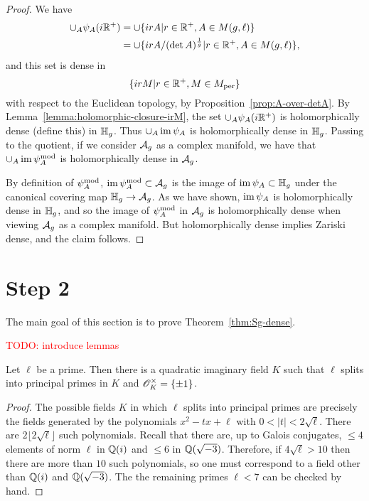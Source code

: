 \documentclass{amsart}
\begin{document}
\begin{proof}
  We have
  \begin{align*}
    \cup_A \psi_A(i\mathbb{R}^+) &= \cup \{irA | r \in \mathbb{R}^+, A \in M(g,\ell)\} \\
               &= \cup \{irA/(\det A)^{\frac{1}{g}} | r \in \mathbb{R}^+, A \in M(g,\ell)\},
  \end{align*}
  and this set is dense in
  \[
    \{irM | r \in \mathbb{R}^+, M \in M_{\textrm{per}}\}
  \]
with respect to the Euclidean topology,  by Proposition~\ref{prop:A-over-detA}.
  By Lemma~\ref{lemma:holomorphic-closure-irM}, the set $\cup_A \psi_A(i\mathbb{R}^+)$ is holomorphically dense (define this) in $\mathbb{H}_g$. Thus $\cup_A \operatorname{im} \psi_A$ is holomorphically dense in $\mathbb{H}_g$. Passing to the quotient, if we consider $\mathcal{A}_g$ as a complex manifold, we have that $\cup_A \operatorname{im} \psi_{A}^\mathrm{mod}$ is holomorphically dense in $\mathcal{A}_g$.

  By definition of $\psi_{A}^\mathrm{mod}$,  $\operatorname{im} \psi_{A}^\mathrm{mod} \subset \mathcal{A}_g$ is the image of $\operatorname{im} \psi_A \subset \mathbb{H}_g$ under the canonical covering map $\mathbb{H}_g \to \mathcal{A}_g$. As we have shown, $\operatorname{im} \psi_A$ is holomorphically dense in $\mathbb{H}_g$, and so the image of $\psi_{A}^\mathrm{mod}$ in $\mathcal{A}_g$ is holomorphically dense when viewing $\mathcal{A}_g$ as a complex manifold. But holomorphically dense implies Zariski dense, and the claim follows.
\end{proof}



\section{Step 2}
\label{sec:step-2}

The main goal of this section is to prove Theorem~\ref{thm:Sg-dense}.

\textcolor{red}{TODO: introduce lemmas}

\begin{lemma}\label{lem:silly}
  Let $\ell$ be a prime. Then there is a quadratic imaginary field $K$ such that $\ell$ splits into principal primes in $K$ and $\mathscr{O}_K^\times = \{\pm 1\}$.
\end{lemma}
\begin{proof}
  The possible fields $K$ in which $\ell$ splits into principal primes are precisely the fields generated by the polynomials $x^2 - tx + \ell$ with $0 < |t| < 2\sqrt{\ell}$. There are $2\lfloor 2\sqrt{\ell} \rfloor$ such polynomials. Recall that there are, up to Galois conjugates, $\leq 4$ elements of norm $\ell$ in $\mathbb{Q}(i)$ and $\leq 6$ in $\mathbb{Q}(\sqrt{-3})$. Therefore, if $4\sqrt{\ell} > 10$ then there are more than $10$ such polynomials, so one must correspond to a field other than $\mathbb{Q}(i)$ and $\mathbb{Q}(\sqrt{-3})$. The the remaining primes $\ell < 7$ can be checked by hand.
\end{proof}
\end{document}
